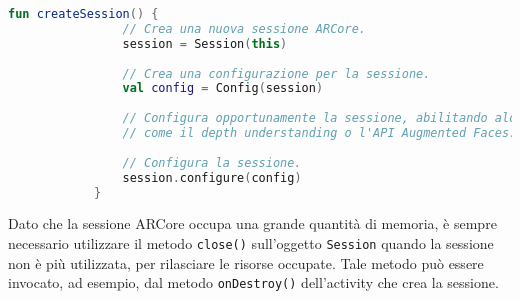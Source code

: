 \documentclass[crop=false, class=book]{standalone}
\begin{document}
	\begin{center}
		\begin{minipage}{0.95\textwidth}
			\begin{lstlisting}[caption={Creazione della sessione ARCore.}, label={lst:create_session}, language=Kotlin]
			fun createSession() {
				// Crea una nuova sessione ARCore.
				session = Session(this)
				
				// Crea una configurazione per la sessione.
				val config = Config(session)
				
				// Configura opportunamente la sessione, abilitando alcune funzionalità specifiche 
				// come il depth understanding o l'API Augmented Faces.
				
				// Configura la sessione.
				session.configure(config)
			}
			\end{lstlisting}
		\end{minipage}
	\end{center} 
 
 	\noindent
 	Dato che la sessione ARCore occupa una grande quantità di memoria, è sempre necessario utilizzare il metodo \verb|close()| sull'oggetto \verb|Session| quando la sessione non è più utilizzata, per rilasciare le risorse occupate. Tale metodo può essere invocato, ad esempio, dal metodo \verb|onDestroy()| dell'activity che crea la sessione.
\end{document}

